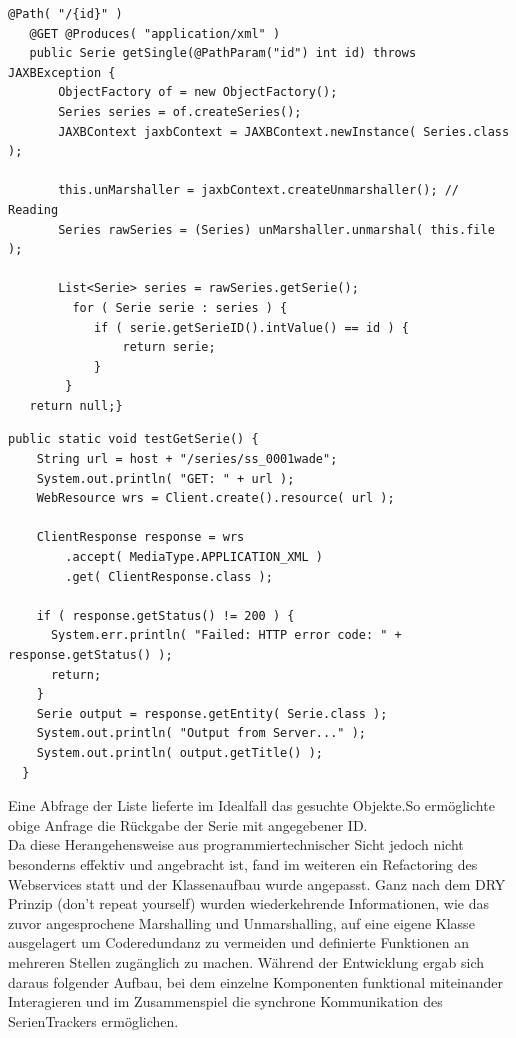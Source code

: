 \begin{lstlisting}[label=seriesservice,caption= GET Testmethode der SeriesID]
   @Path( "/{id}" )
   @GET @Produces( "application/xml" )
   public Serie getSingle(@PathParam("id") int id) throws JAXBException {
       ObjectFactory of = new ObjectFactory();
       Series series = of.createSeries();
       JAXBContext jaxbContext = JAXBContext.newInstance( Series.class );

       this.unMarshaller = jaxbContext.createUnmarshaller(); // Reading
       Series rawSeries = (Series) unMarshaller.unmarshal( this.file );

       List<Serie> series = rawSeries.getSerie();
         for ( Serie serie : series ) {
            if ( serie.getSerieID().intValue() == id ) {
                return serie;
            }
        }
   return null;}
\end{lstlisting}
\begin{lstlisting}[label=testclient,caption= Anfrage des Testclients nach Serie mit angegebener ID]
public static void testGetSerie() {
    String url = host + "/series/ss_0001wade";
    System.out.println( "GET: " + url );
    WebResource wrs = Client.create().resource( url );

    ClientResponse response = wrs
        .accept( MediaType.APPLICATION_XML )
        .get( ClientResponse.class );

    if ( response.getStatus() != 200 ) {
      System.err.println( "Failed: HTTP error code: " + response.getStatus() );
      return;
    }
    Serie output = response.getEntity( Serie.class );
    System.out.println( "Output from Server..." );
    System.out.println( output.getTitle() );
  }
\end{lstlisting}

Eine Abfrage der Liste lieferte im Idealfall das gesuchte Objekte.So ermöglichte obige Anfrage die Rückgabe der Serie mit angegebener ID.\\
Da diese Herangehensweise aus programmiertechnischer Sicht jedoch nicht besonderns effektiv und angebracht ist, fand im weiteren ein Refactoring des Webservices statt und der Klassenaufbau wurde angepasst. Ganz nach dem DRY Prinzip (don't repeat yourself) wurden wiederkehrende Informationen, wie das zuvor angesprochene Marshalling und Unmarshalling, auf eine eigene Klasse ausgelagert um Coderedundanz zu vermeiden und definierte Funktionen an mehreren Stellen zugänglich zu machen. Während der Entwicklung ergab sich daraus folgender Aufbau, bei dem einzelne Komponenten funktional miteinander Interagieren und im Zusammenspiel die synchrone Kommunikation des SerienTrackers ermöglichen.

